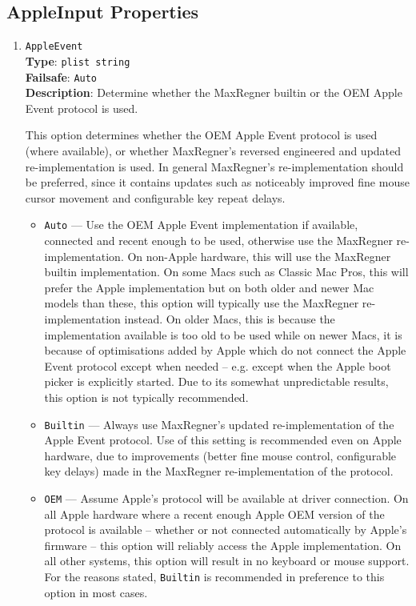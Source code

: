 \documentclass[]{article}
\providecommand{\tightlist}{%
  \setlength{\itemsep}{0pt}\setlength{\parskip}{0pt}}
\begin{document}
\begin{enumerate}
\end{enumerate}

\subsection{AppleInput Properties}\label{uefiappleinputprops}

\begin{enumerate}

\item
  \texttt{AppleEvent}\\
  \textbf{Type}: \texttt{plist\ string}\\
  \textbf{Failsafe}: \texttt{Auto}\\
  \textbf{Description}: Determine whether the MaxRegner builtin or the OEM Apple Event protocol is used.

  This option determines whether the OEM Apple Event protocol is used (where available), or
  whether MaxRegner's reversed engineered and updated re-implementation is used. In general
  MaxRegner's re-implementation should be preferred, since it contains updates such as noticeably
  improved fine mouse cursor movement and configurable key repeat delays.

  \begin{itemize}
  \tightlist
  \item \texttt{Auto} --- Use the OEM Apple Event implementation if available, connected and
  recent enough to be used, otherwise use the MaxRegner re-implementation.
  On non-Apple hardware, this will use the MaxRegner builtin implementation.
  On some Macs such as Classic Mac Pros, this will prefer the Apple implementation but on both older and
  newer Mac models than these, this option will typically use the MaxRegner re-implementation instead.
  On older Macs, this is because the implementation available is too old to be used while on newer Macs,
  it is because of optimisations added by Apple which do not connect the Apple Event protocol
  except when needed -- e.g. except when the Apple boot picker is explicitly started.
  Due to its somewhat unpredictable results, this option is not typically recommended.
  \item \texttt{Builtin} ---  Always use MaxRegner's updated re-implementation of the Apple Event protocol.
  Use of this setting is recommended even on Apple hardware, due to
  improvements (better fine mouse control, configurable key delays) made in the MaxRegner re-implementation
  of the protocol.
  \item \texttt{OEM} --- Assume Apple's protocol will be available at driver connection. On all Apple hardware
  where a recent enough Apple OEM version of the protocol is available -- whether or not connected automatically
  by Apple's firmware -- this option will reliably access the Apple implementation. On all other systems, this
  option will result in no keyboard or mouse support. For the reasons stated, \texttt{Builtin} is recommended in
  preference to this option in most cases.
  \end{itemize}


\end{enumerate}
\end{document}

